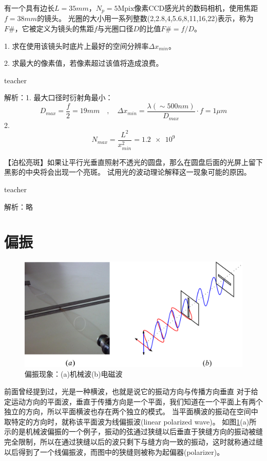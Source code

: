 \begin{example}
	有一个具有边长$L = 35\si{mm}$，$N_p = 5 \text{Mpix}$像素CCD感光片的数码相机，使用焦距$f = 38\si{mm}$的镜头。
	光圈的大小用一系列整数(2,2.8,4,5.6,8,11,16,22)表示，称为$F\#$，它被定义为镜头的焦距$f$与光圈口径$D$的比值$F\# = f/D$。
	
	1. 求在使用该镜头时底片上最好的空间分辨率$\Delta x_{min}$。
	
	2. 求最大的像素值，若像素超过该值将造成浪费。
	\begin{taggedblock}{teacher}
		
		解析：1. 最大口径时衍射角最小：
		\[D_{max}=\frac{f}{2}=19\si{mm}\quad,\quad \Delta x_{min}=\frac{\lambda(\sim 500\si{nm})}{D_{max}}\cdot f=1\unit{\mu m}\]
		2. \[N_{max}=\frac{L^2}{x_{min}^2}=\num{1.2e9}\]
	\end{taggedblock}
\end{example}%

\begin{example}

【泊松亮斑】如果让平行光垂直照射不透光的圆盘，那么在圆盘后面的光屏上留下黑影的中央将会出现一个亮斑。
试用光的波动理论解释这一现象可能的原因。
\begin{taggedblock}{teacher}

解析：略
\end{taggedblock}
\end{example}

\section{偏振}
\begin{figure}
\centering
\includegraphics[width=0.8\linewidth]{images/em-theory-4}
\caption{偏振现象：(a)机械波(b)电磁波}
\label{fig:em-theory-4}
\end{figure}
前面曾经提到过，光是一种横波，也就是说它的振动方向与传播方向垂直
对于给定运动方向的平面波，垂直于传播方向是一个平面，我们知道在一个平面上有两个独立的方向，所以平面横波也存在两个独立的模式。
当平面横波的振动在空间中取特定的方向时，就称该平面波为{\heiti 线偏振波}(linear polarized wave)。
如图\ref{fig:em-theory-4}(a)所示的是机械波偏振的一个例子，振动的弦通过狭缝以后垂直于狭缝方向的振动被缝完全限制，所以在通过狭缝以后的波只剩下与缝方向一致的振动，这时就称通过缝以后得到了一个线偏振波，而图中的狭缝则被称为{\heiti 起偏器}(polarizer)。



